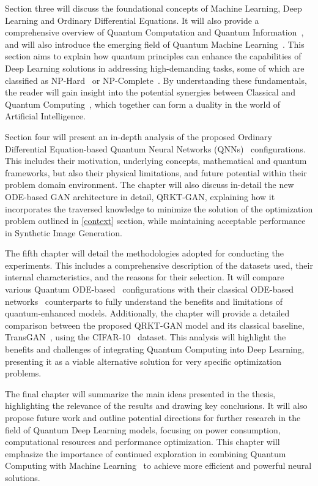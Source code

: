 \documentclass[12pt,a4paper]{report}
\begin{document}
Section three will discuss the foundational concepts of Machine Learning, Deep Learning and Ordinary Differential Equations. It will also provide a comprehensive overview of Quantum Computation and Quantum Information~\cite{nielsen2001quantum}, and will also introduce the emerging field of Quantum Machine Learning~\cite{dunjko2018machine}. This section aims to explain how quantum principles can enhance the capabilities of Deep Learning solutions in addressing high-demanding tasks, some of which are classified as NP-Hard~\cite{chatterjee2024solving} or NP-Complete~\cite{furer2008solving}. By understanding these fundamentals, the reader will gain insight into the potential synergies between Classical and Quantum Computing~\cite{nielsen2001quantum}, which together can form a duality in the world of Artificial Intelligence.

Section four will present an in-depth analysis of the proposed Ordinary Differential Equation-based Quantum Neural Networks (QNNs)~\cite{abbas2021power, li2022ode} configurations. This includes their motivation, underlying concepts, mathematical and quantum frameworks, but also their physical limitations, and future potential within their problem domain environment. The chapter will also discuss in-detail the new ODE-based GAN architecture in detail, QRKT-GAN, explaining how it incorporates the traversed knowledge to minimize the solution of the optimization problem outlined in \ref{context} section, while maintaining acceptable performance in Synthetic Image Generation.

The fifth chapter will detail the methodologies adopted for conducting the experiments. This includes a comprehensive description of the datasets used, their internal characteristics, and the reasons for their selection. It will compare various Quantum ODE-based~\cite{fan2024Quantum} configurations with their classical ODE-based networks~\cite{zhong2022neural} counterparts to fully understand the benefits and limitations of quantum-enhanced models. Additionally, the chapter will provide a detailed comparison between the proposed QRKT-GAN model and its classical baseline, TransGAN~\cite{jiang2021transgan}, using the CIFAR-10~\cite{Krizhevsky09learningmultiple} dataset. This analysis will highlight the benefits and challenges of integrating Quantum Computing into Deep Learning, presenting it as a viable alternative solution for very specific optimization problems.

The final chapter will summarize the main ideas presented in the thesis, highlighting the relevance of the results and drawing key conclusions. It will also propose future work and outline potential directions for further research in the field of Quantum Deep Learning models, focusing on power consumption, computational resources and performance optimization. This chapter will emphasize the importance of continued exploration in combining Quantum Computing with Machine Learning~\cite{dunjko2018machine} to achieve more efficient and powerful neural solutions.
\end{document}
